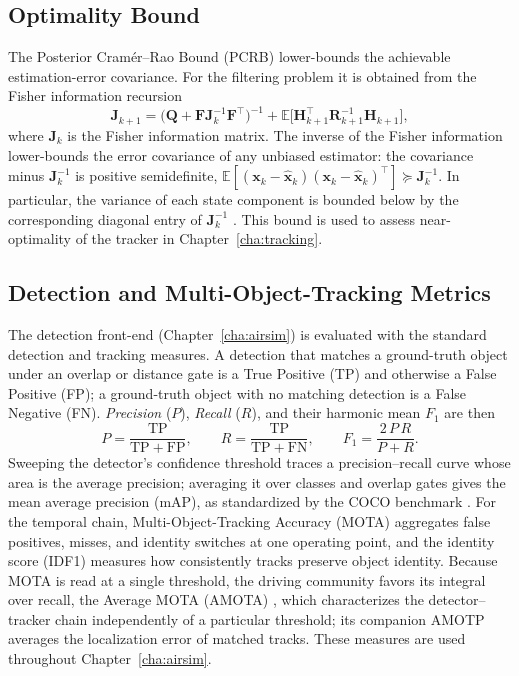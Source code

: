 \subsection{Optimality Bound}
The Posterior Cram\'er--Rao Bound (PCRB) lower-bounds
the achievable estimation-error covariance. For the filtering problem it is
obtained from the Fisher information recursion
\begin{equation}
  \bm{J}_{k+1} = \big(\bm{Q}+\bm{F}\bm{J}_k^{-1}\bm{F}^{\top}\big)^{-1}
              + \mathbb{E}\!\big[\bm{H}_{k+1}^{\top}\bm{R}_{k+1}^{-1}\bm{H}_{k+1}\big],
  \label{eq:pcrb}
\end{equation}
where $\bm{J}_k$ is the Fisher information matrix. The inverse of the Fisher
information lower-bounds the error covariance of any unbiased estimator: the
covariance minus $\bm{J}_k^{-1}$ is positive semidefinite,
$\mathbb{E}[(\bm{x}_k-\hat{\bm{x}}_k)(\bm{x}_k-\hat{\bm{x}}_k)^{\top}]\succeq\bm{J}_k^{-1}$.
In particular, the variance of each state component is bounded below by the
corresponding diagonal entry of $\bm{J}_k^{-1}$ \cite{tichavsky1998}. This bound is used to assess near-optimality of the
tracker in Chapter~\ref{cha:tracking}.

\subsection{Detection and Multi-Object-Tracking Metrics}
\label{sec:detmetrics}

The detection front-end (Chapter~\ref{cha:airsim}) is evaluated with the standard
detection and tracking measures. A detection that matches a ground-truth object
under an overlap or distance gate is a True Positive (TP) and otherwise a False
Positive (FP); a ground-truth object with no matching detection is a False
Negative (FN). \emph{Precision} ($P$), \emph{Recall} ($R$), and their harmonic
mean $F_1$ are then
\begin{equation}
  P = \frac{\mathrm{TP}}{\mathrm{TP}+\mathrm{FP}}, \qquad
  R = \frac{\mathrm{TP}}{\mathrm{TP}+\mathrm{FN}}, \qquad
  F_1 = \frac{2\,P\,R}{P+R}.
  \label{eq:prf1}
\end{equation}
Sweeping the detector's confidence threshold traces a precision--recall curve
whose area is the average precision; averaging it over classes and overlap gates
gives the mean average precision (mAP), as standardized by the COCO benchmark
\cite{lin2014coco}.
For the temporal chain, Multi-Object-Tracking Accuracy (MOTA) aggregates false positives,
misses, and identity switches at one operating point, and the identity score
(IDF1) measures how consistently tracks preserve object identity. Because MOTA is
read at a single threshold, the driving community favors its integral over recall,
the Average MOTA (AMOTA) \cite{weng2020ab3dmot}, which characterizes the
detector--tracker chain independently of a particular threshold; its companion
AMOTP averages the localization error of matched tracks. These measures are used
throughout Chapter~\ref{cha:airsim}.

